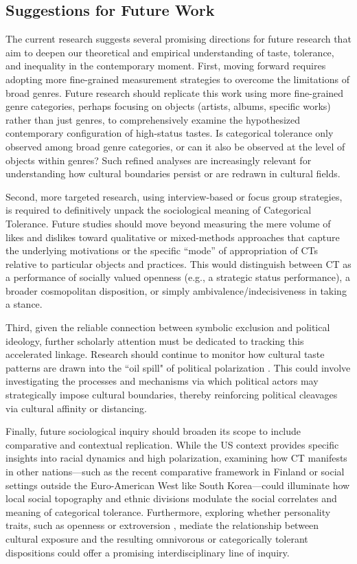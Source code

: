 \documentclass[12pt]{article}
\begin{document}
\subsection*{Suggestions for Future Work}
The current research suggests several promising directions for future research that aim to deepen our theoretical and empirical understanding of taste, tolerance, and inequality in the contemporary moment. First, moving forward requires adopting more fine-grained measurement strategies to overcome the limitations of broad genres. Future research should replicate this work using more fine-grained genre categories, perhaps focusing on objects (artists, albums, specific works) rather than just genres, to comprehensively examine the hypothesized contemporary configuration of high-status tastes. Is categorical tolerance only observed among broad genre categories, or can it also be observed at the level of objects within genres? Such refined analyses are increasingly relevant for understanding how cultural boundaries persist or are redrawn in cultural fields.

Second, more targeted research, using interview-based or focus group strategies, is required to definitively unpack the sociological meaning of Categorical Tolerance. Future studies should move beyond measuring the mere volume of likes and dislikes toward qualitative or mixed-methods approaches that capture the underlying motivations or the specific ``mode'' of appropriation of CTs relative to particular objects and practices. This would distinguish between CT as a performance of socially valued openness (e.g., a strategic status performance), a broader cosmopolitan disposition, or simply ambivalence/indecisiveness in taking a stance.

Third, given the reliable connection between symbolic exclusion and political ideology, further scholarly attention must be dedicated to tracking this accelerated linkage. Research should continue to monitor how cultural taste patterns are drawn into the ``oil spill" of political polarization \citep{dellaposta2020pluralistic-ed4}. This could involve investigating the processes and mechanisms via which political actors may strategically impose cultural boundaries, thereby reinforcing political cleavages via cultural affinity or distancing.

Finally, future sociological inquiry should broaden its scope to include comparative and contextual replication. While the US context provides specific insights into racial dynamics and high polarization, examining how CT manifests in other nations---such as the recent comparative framework in Finland or social settings outside the Euro-American West like South Korea---could illuminate how local social topography and ethnic divisions modulate the social correlates and meaning of categorical tolerance. Furthermore, exploring whether personality traits, such as openness or extroversion \citep{andrews2022culture-390}, mediate the relationship between cultural exposure and the resulting omnivorous or categorically tolerant dispositions could offer a promising interdisciplinary line of inquiry.

\newpage


\end{document}

